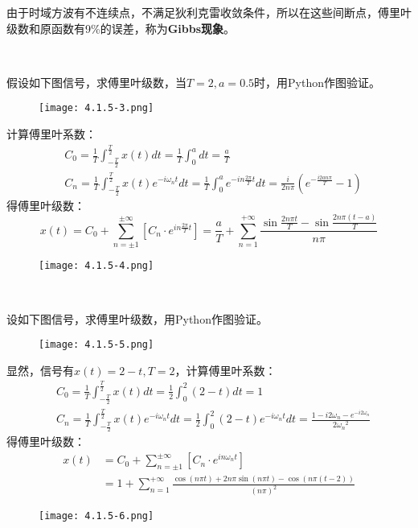 \begin{tcolorbox}
由于时域方波有不连续点，不满足狄利克雷收敛条件，所以在这些间断点，傅里叶级数和原函数有9\%的误差，称为{\bf Gibbs现象}。
\end{tcolorbox}

~

\begin{example}
假设如下图信号，求傅里叶级数，当$T=2,a=0.5$时，用Python作图验证。
\begin{figure}[h]
\centering
\texttt{[image: 4.1.5-3.png]}
\end{figure}
\end{example}

计算傅里叶系数：
\begin{align*}
&C_0=\frac{1}{T}\int_{-\frac{T}{2}}^{\frac{T}{2}}{x\left( t \right) dt}=\frac{1}{T}\int_0^a{dt}=\frac{a}{T} \\
&C_n=\frac{1}{T}\int_{-\frac{T}{2}}^{\frac{T}{2}}{x\left( t \right) e^{-i\omega _nt}dt}=\frac{1}{T}\int_0^a{e^{-in\frac{2\pi}{T}t}dt} =\frac{i}{2n\pi}\left( e^{-\frac{i2an\pi}{T}}-1 \right)
\end{align*}
得傅里叶级数：
\[
x\left( t \right) =C_0+\sum_{n=\pm 1}^{\pm \infty}{\left[ C_n\cdot e^{in\frac{2\pi}{T}t} \right]}=\frac{a}{T}+\sum_{n=1}^{+\infty}{\frac{\sin \frac{2n\pi t}{T}-\sin \frac{2n\pi \left( t-a \right)}{T}}{n\pi}}
\]
\begin{figure}[h]
\centering
\texttt{[image: 4.1.5-4.png]}
\end{figure}

~

\begin{example}
设如下图信号，求傅里叶级数，用Python作图验证。
\begin{figure}[h]
\centering
\texttt{[image: 4.1.5-5.png]}
\end{figure}
\end{example}

显然，信号有$x\left( t \right) =2-t,T=2$，计算傅里叶系数：
\begin{align*}
&C_0=\frac{1}{T}\int_{-\frac{T}{2}}^{\frac{T}{2}}{x\left( t \right) dt}=\frac{1}{2}\int_0^2{\left( 2-t \right) dt}=1 \\
&C_n=\frac{1}{T}\int_{-\frac{T}{2}}^{\frac{T}{2}}{x\left( t \right) e^{-i\omega _nt}dt}=\frac{1}{2}\int_0^2{\left( 2-t \right) e^{-i\omega _nt}dt}=\frac{1-i2\omega _n-e^{-i2\omega _n}}{2{\omega _n}^2}
\end{align*}
得傅里叶级数：
\begin{align*}
x\left( t \right) &=C_0+\sum_{n=\pm 1}^{\pm \infty}{\left[ C_n\cdot e^{in\omega _nt} \right]} \\
&=1+\sum_{n=1}^{+\infty}{\frac{\cos \left( n\pi t \right) +2n\pi \sin \left( n\pi t \right) -\cos \left( n\pi \left( t-2 \right) \right)}{\left( n\pi \right) ^2}}
\end{align*}
\begin{figure}[h]
\centering
\texttt{[image: 4.1.5-6.png]}
\end{figure}




